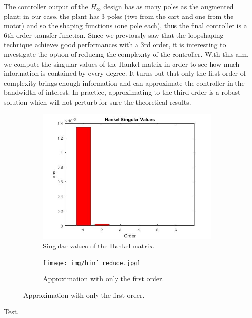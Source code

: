 The controller output of the $H_{\infty}$ design has as many poles as the augmented plant; in our case, the plant has 3 poles (two from the cart and one from the motor) and so the shaping functions (one pole each), thus the final controller is a 6th order transfer function. Since we previously saw that the loopshaping technique achieves good performances with a 3rd order, it is interesting to investigate the option of reducing the complexity of the controller. With this aim, we compute the singular values of the Hankel matrix in order to see how much information is contained by every degree. It turns out that only the first order of complexity brings enough information and can approximate the controller in the bandwidth of interest. In practice, approximating to the third order is a robust solution which will not perturb for sure the theoretical results.

\begin{figure}[H]

\begin{subfigure}{0.49\textwidth}
\includegraphics[width=\textwidth]{img/hinf_hankel.jpg}
\caption{Singular values of the Hankel matrix.}
\end{subfigure}

\begin{subfigure}{0.49\textwidth}
\texttt{[image: img/hinf\_reduce.jpg]}
\caption{Approximation with only the first order.}
\end{subfigure}

\end{figure}


Test.
